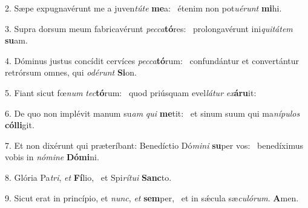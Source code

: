 2. Sæpe expugnavérunt me a juven\textit{tú}\textit{te} \textbf{me}a: \ast\  étenim non pot\textit{u}\textit{é}\textit{runt} \textbf{mi}hi.\

3. Supra dorsum meum fabricavérunt \textit{pec}\textit{ca}\textbf{tó}res: \ast\  prolongavérunt ini\textit{qui}\textit{tá}\textit{tem} \textbf{su}am.\

4. Dóminus justus concídit cervíces \textit{pec}\textit{ca}\textbf{tó}rum: \ast\  confundántur et convertántur retrórsum omnes, qui \textit{o}\textit{dé}\textit{runt} \textbf{Si}on.\

5. Fiant sicut fœ\textit{num} \textit{tec}\textbf{tó}rum: \ast\  quod priúsquam evel\textit{lá}\textit{tur} \textit{ex}\textbf{á}\textbf{ru}it:\

6. De quo non implévit manum su\textit{am} \textit{qui} \textbf{me}tit: \ast\  et sinum suum qui ma\textit{ní}\textit{pu}\textit{los} \textbf{cól}\textbf{li}git.\

7. Et non dixérunt qui præteríbant: Benedíctio Dó\textit{mi}\textit{ni} \textbf{su}per vos: \ast\  benedíximus vobis in \textit{nó}\textit{mi}\textit{ne} \textbf{Dó}\textbf{mi}ni.\

8. Glória Pa\textit{tri}, \textit{et} \textbf{Fí}lio, \ast\  et Spi\textit{rí}\textit{tu}\textit{i} \textbf{Sanc}to.\

9. Sicut erat in princípio, et \textit{nunc}, \textit{et} \textbf{sem}per, \ast\  et in sǽcula sæ\textit{cu}\textit{ló}\textit{rum}. \textbf{A}men.\

